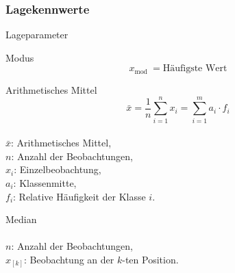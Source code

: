 \raggedcolumns

\subsubsection{Lagekennwerte}

\begin{definition}{Lageparameter}
\end{definition}

\begin{definition}{Modus}
$$
x_{\text {mod }}=\text{Häufigste Wert}
$$
\end{definition}

\begin{minipage}{0.5\columnwidth}
\begin{concept}{Arithmetisches Mittel}
$$
\bar{x}=\frac{1}{n} \sum_{i=1}^{n} x_{i}=\sum_{i=1}^{m} a_{i} \cdot f_{i}
$$
\\
$\bar{x}$: Arithmetisches Mittel, \\
$n$: Anzahl der Beobachtungen, \\
$x_{i}$: Einzelbeobachtung, \\
$a_{i}$: Klassenmitte, \\
$f_{i}$: Relative Häufigkeit der Klasse $i$.
\end{concept}
\end{minipage}%
\begin{minipage}{0.5\columnwidth}
\begin{concept}{Median}
\\
\\
$n$: Anzahl der Beobachtungen, \\
$x_{[k]}$: Beobachtung an der $k$-ten Position.
\end{concept}
\end{minipage}

